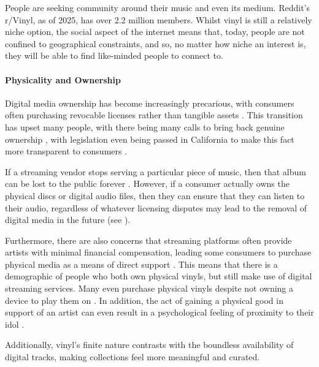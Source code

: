                 People are seeking community around their music and even its medium. Reddit's r/Vinyl, as of 2025, has over 2.2 million members. Whilst vinyl is still a relatively niche option, the social aspect of the internet means that, today, people are not confined to geographical constraints, and so, no matter how niche an interest is, they will be able to find like-minded people to connect to.
          
            \paragraph{Physicality and Ownership} %
    
                Digital media ownership has become increasingly precarious, with consumers often purchasing revocable licenses rather than tangible assets \cite{verge2024steam_license}. This transition has upset many people, with there being many calls to bring back genuine ownership \cite{stanton2024gamers_pushback}, with legislation even being passed in California to make this fact more transparent to consumers \cite{california2024ab2426}.
    
                If a streaming vendor stops serving a particular piece of music, then that album can be lost to the public forever \cite{polygon2024cartoon_network_delisting}. However, if a consumer actually owns the physical discs or digital audio files, then they can ensure that they can listen to their audio, regardless of whatever licensing disputes may lead to the removal of digital media in the future (see \cite{bains2022lotr_strategy}).
    
                Furthermore, there are also concerns that streaming platforms often provide artists with minimal financial compensation, leading some consumers to purchase physical media as a means of direct support \cite{historyandrevivalofvinyls}. This means that there is a demographic of people who both own physical vinyls, but still make use of digital streaming services. Many even purchase physical vinyls despite not owning a device to play them on \cite{Trapp2023}. In addition, the act of gaining a physical good in support of an artist can even result in a psychological feeling of proximity to their idol \cite{historyandrevivalofvinyls}.
                
                Additionally, vinyl's finite nature contrasts with the boundless availability of digital tracks, making collections feel more meaningful and curated.
    
